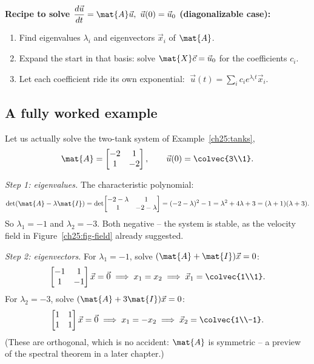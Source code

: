 \begin{focusbox}
\textbf{Recipe to solve $\dfrac{d\vec{u}}{dt}=\mat{A}\vec{u},\ \vec{u}(0)=\vec{u}_0$
(diagonalizable case):}
\begin{enumerate}
  \item Find eigenvalues $\lambda_i$ and eigenvectors $\vec{x}_i$ of $\mat{A}$.
  \item Expand the start in that basis: solve $\mat{X}\vec{c}=\vec{u}_0$ for the
        coefficients $c_i$.
  \item Let each coefficient ride its own exponential:
        $\;\vec{u}(t)=\sum_i c_i e^{\lambda_i t}\vec{x}_i.$
\end{enumerate}
\end{focusbox}

\subsection{A fully worked example}
\label{ch25:tanks-solved}

Let us actually solve the two-tank system of Example~\ref{ch25:tanks},
\[
  \mat{A} = \begin{bmatrix} -2 & 1 \\ 1 & -2 \end{bmatrix},
  \qquad
  \vec{u}(0) = \colvec{3\\1}.
\]

\emph{Step 1: eigenvalues.} The characteristic polynomial:
\[
  \det(\mat{A}-\lambda\mat{I})
  = \det\!\begin{bmatrix} -2-\lambda & 1 \\ 1 & -2-\lambda \end{bmatrix}
  = (-2-\lambda)^2 - 1
  = \lambda^2 + 4\lambda + 3
  = (\lambda+1)(\lambda+3).
\]
So $\lambda_1 = -1$ and $\lambda_2 = -3$. Both negative -- the system is stable,
as the velocity field in Figure~\ref{ch25:fig-field} already suggested.

\emph{Step 2: eigenvectors.} For $\lambda_1=-1$, solve $(\mat{A}+\mat{I})\vec{x}=0$:
\[
  \begin{bmatrix} -1 & 1 \\ 1 & -1 \end{bmatrix}\vec{x} = \vec{0}
  \;\Longrightarrow\; x_1 = x_2
  \;\Longrightarrow\; \vec{x}_1 = \colvec{1\\1}.
\]
For $\lambda_2=-3$, solve $(\mat{A}+3\mat{I})\vec{x}=0$:
\[
  \begin{bmatrix} 1 & 1 \\ 1 & 1 \end{bmatrix}\vec{x} = \vec{0}
  \;\Longrightarrow\; x_1 = -x_2
  \;\Longrightarrow\; \vec{x}_2 = \colvec{1\\-1}.
\]
(These are orthogonal, which is no accident: $\mat{A}$ is symmetric -- a preview
of the spectral theorem in a later chapter.)

